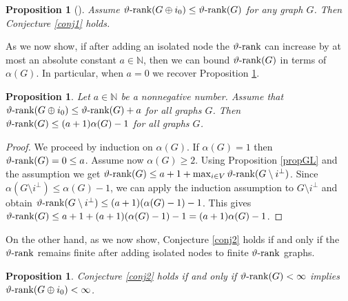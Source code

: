 \documentclass[11pt]{article}
\newcommand{\oN}{{\mathbb N}}
\newcommand{\ignore}[1]{}
\newtheorem{proposition}[theorem]{Proposition}
\numberwithin{equation}{section}
\newcommand{\rrank}{\vartheta\text{\rm -rank}}
\begin{document}
\begin{proposition}[\cite{GL2007}]\label{adding-iso-rk}
Assume $\rrank (G\oplus i_0)\le \rrank (G)$ for any graph $G$. Then Conjecture \ref{conj1} holds.
\end{proposition}
\ignore{
\begin{proof}
We show $\rrank(G)\le \alpha(G)-1$ by induction on the number of nodes.
Note $\alpha(G\setminus i^\perp) \le \alpha(G)-1$ for any $i\in V$. By the induction assumption we have that  $\rrank(G\setminus i^\perp)\le \alpha(G\setminus i^\perp)-1\le \alpha(G)-2$.
Using the assumption of the lemma, we have $\rrank(G\setminus i^\perp \oplus i) \le \rrank(G\setminus i^\perp) \le \alpha(G)-2$. We now use Proposition \ref{propGL} to conclude that $\rrank(G)\le \alpha(G)-1$. 
\end{proof}
}
As we now show,  if after adding an isolated node the  $\rrank$ can increase by at most  an absolute constant $a\in\oN$, 
then we can bound $\rrank(G)$ in terms of $\alpha(G)$. In particular, when $a=0$ we recover Proposition \ref{adding-iso-rk}.
\begin{proposition}
Let $a\in \mathbb{N}$ be a nonnegative number. Assume that $\rrank(G\oplus i_0)\leq \rrank(G)+a$ for all graphs $G$. Then $\rrank(G)\leq (a+1)\alpha(G)-1$ for all graphs $G$.
\end{proposition}
\begin{proof}
We proceed by induction on $\alpha(G)$. If $\alpha(G)=1$ then $\rrank(G)=0\leq a$. Assume now $\alpha(G)\ge 2$. Using  Proposition \ref{propGL} and the assumption we get $\rrank(G)\leq a+1 + \max_{i\in V}\rrank(G\setminus i^\perp)$. Since $\alpha(G\setminus i^\perp)\leq \alpha(G)-1$, we can apply  the induction assumption  to $G
\setminus i^\perp$ and  obtain $\rrank(G\setminus i^\perp)\leq (a+1)(\alpha(G)-1)-1$. This gives $\rrank(G)\leq a+1 + (a+1)(\alpha(G)-1)-1 = (a+1)\alpha(G)-1$.
\end{proof}
On the other hand, as we now show, Conjecture \ref{conj2} holds if and only if the $\rrank$ remains finite after adding isolated nodes to finite $\rrank$ graphs.
\begin{proposition}\label{adding-iso-rk-f}
Conjecture \ref{conj2} holds if and only if $\rrank(G)<\infty$ implies $\rrank(G\oplus i_0)<\infty$.
\end{proposition}
\end{document}
